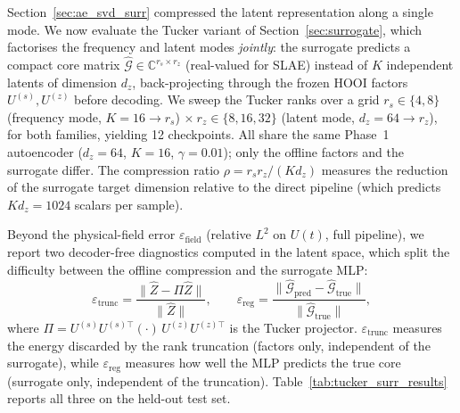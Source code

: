 ﻿\documentclass[a4paper,12pt]{article}
\theoremstyle{definition}
\theoremstyle{remark}
\newcommand{\C}{\mathbb{C}}
\begin{document}
Section~\ref{sec:ae_svd_surr} compressed the latent representation along a single mode. We now evaluate the Tucker variant of Section~\ref{sec:surrogate}, which factorises the frequency and latent modes \emph{jointly}: the surrogate predicts a compact core matrix $\hat{\mathcal{G}} \in \C^{r_s \times r_z}$ (real-valued for SLAE) instead of $K$ independent latents of dimension $d_z$, back-projecting through the frozen HOOI factors $U^{(s)}, U^{(z)}$ before decoding. We sweep the Tucker ranks over a grid $r_s \in \{4, 8\}$ (frequency mode, $K = 16 \to r_s$) $\times\ r_z \in \{8, 16, 32\}$ (latent mode, $d_z = 64 \to r_z$), for both families, yielding 12 checkpoints. All share the same Phase~1 autoencoder ($d_z = 64$, $K = 16$, $\gamma = 0.01$); only the offline factors and the surrogate differ. The compression ratio $\rho = r_s r_z / (K d_z)$ measures the reduction of the surrogate target dimension relative to the direct pipeline (which predicts $K d_z = 1024$ scalars per sample).

Beyond the physical-field error $\varepsilon_{\mathrm{field}}$ (relative $L^2$ on $U(t)$, full pipeline), we report two decoder-free diagnostics computed in the latent space, which split the difficulty between the offline compression and the surrogate MLP:
\begin{equation}
    \varepsilon_{\mathrm{trunc}} = \frac{\|\hat{Z} - \Pi\hat{Z}\|}{\|\hat{Z}\|},
    \qquad
    \varepsilon_{\mathrm{reg}} = \frac{\|\hat{\mathcal{G}}_{\mathrm{pred}} - \hat{\mathcal{G}}_{\mathrm{true}}\|}{\|\hat{\mathcal{G}}_{\mathrm{true}}\|},
\end{equation}
where $\Pi = U^{(s)}U^{(s)\top}(\cdot)\,U^{(z)}U^{(z)\top}$ is the Tucker projector. $\varepsilon_{\mathrm{trunc}}$ measures the energy discarded by the rank truncation (factors only, independent of the surrogate), while $\varepsilon_{\mathrm{reg}}$ measures how well the MLP predicts the true core (surrogate only, independent of the truncation). Table~\ref{tab:tucker_surr_results} reports all three on the held-out test set.
\end{document}
